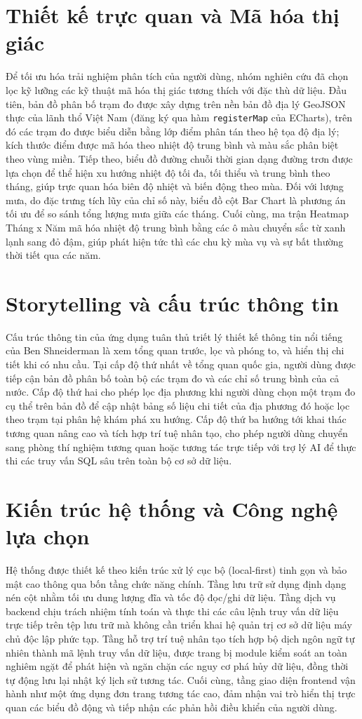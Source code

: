 \section{Thiết kế trực quan và Mã hóa thị giác}
Để tối ưu hóa trải nghiệm phân tích của người dùng, nhóm nghiên cứu đã chọn lọc kỹ lưỡng các kỹ thuật mã hóa thị giác tương thích với đặc thù dữ liệu. Đầu tiên, bản đồ phân bố trạm đo được xây dựng trên nền bản đồ địa lý GeoJSON thực của lãnh thổ Việt Nam (đăng ký qua hàm \texttt{registerMap} của ECharts), trên đó các trạm đo được biểu diễn bằng lớp điểm phân tán theo hệ tọa độ địa lý; kích thước điểm được mã hóa theo nhiệt độ trung bình và màu sắc phân biệt theo vùng miền. Tiếp theo, biểu đồ đường chuỗi thời gian dạng đường trơn được lựa chọn để thể hiện xu hướng nhiệt độ tối đa, tối thiểu và trung bình theo tháng, giúp trực quan hóa biên độ nhiệt và biến động theo mùa. Đối với lượng mưa, do đặc trưng tích lũy của chỉ số này, biểu đồ cột Bar Chart là phương án tối ưu để so sánh tổng lượng mưa giữa các tháng. Cuối cùng, ma trận Heatmap Tháng x Năm mã hóa nhiệt độ trung bình bằng các ô màu chuyển sắc từ xanh lạnh sang đỏ đậm, giúp phát hiện tức thì các chu kỳ mùa vụ và sự bất thường thời tiết qua các năm.

\section{Storytelling và cấu trúc thông tin}
Cấu trúc thông tin của ứng dụng tuân thủ triết lý thiết kế thông tin nổi tiếng của Ben Shneiderman là xem tổng quan trước, lọc và phóng to, và hiển thị chi tiết khi có nhu cầu. Tại cấp độ thứ nhất về tổng quan quốc gia, người dùng được tiếp cận bản đồ phân bố toàn bộ các trạm đo và các chỉ số trung bình của cả nước. Cấp độ thứ hai cho phép lọc địa phương khi người dùng chọn một trạm đo cụ thể trên bản đồ để cập nhật bảng số liệu chi tiết của địa phương đó hoặc lọc theo trạm tại phân hệ khám phá xu hướng. Cấp độ thứ ba hướng tới khai thác tương quan nâng cao và tích hợp trí tuệ nhân tạo, cho phép người dùng chuyển sang phòng thí nghiệm tương quan hoặc tương tác trực tiếp với trợ lý AI để thực thi các truy vấn SQL sâu trên toàn bộ cơ sở dữ liệu.

\section{Kiến trúc hệ thống và Công nghệ lựa chọn}
Hệ thống được thiết kế theo kiến trúc xử lý cục bộ (local-first) tinh gọn và bảo mật cao thông qua bốn tầng chức năng chính. Tầng lưu trữ sử dụng định dạng nén cột nhằm tối ưu dung lượng đĩa và tốc độ đọc/ghi dữ liệu. Tầng dịch vụ backend chịu trách nhiệm tính toán và thực thi các câu lệnh truy vấn dữ liệu trực tiếp trên tệp lưu trữ mà không cần triển khai hệ quản trị cơ sở dữ liệu máy chủ độc lập phức tạp. Tầng hỗ trợ trí tuệ nhân tạo tích hợp bộ dịch ngôn ngữ tự nhiên thành mã lệnh truy vấn dữ liệu, được trang bị module kiểm soát an toàn nghiêm ngặt để phát hiện và ngăn chặn các nguy cơ phá hủy dữ liệu, đồng thời tự động lưu lại nhật ký lịch sử tương tác. Cuối cùng, tầng giao diện frontend vận hành như một ứng dụng đơn trang tương tác cao, đảm nhận vai trò hiển thị trực quan các biểu đồ động và tiếp nhận các phản hồi điều khiển của người dùng.

